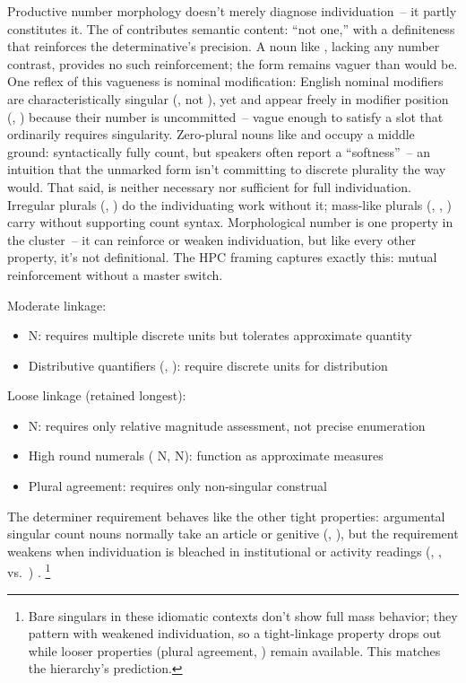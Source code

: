\documentclass[12pt,a4paper]{article}
\begin{document}
Productive number morphology doesn't merely diagnose individuation~-- it partly constitutes it. The  of  contributes semantic content: ``not one,'' with a definiteness that reinforces the determinative's precision. A noun like , lacking any number contrast, provides no such reinforcement; the form remains vaguer than  would be. One reflex of this vagueness is nominal modification: English nominal modifiers are characteristically singular (, not ), yet  and  appear freely in modifier position (, ) because their number is uncommitted~-- vague enough to satisfy a slot that ordinarily requires singularity. Zero-plural nouns like  and  occupy a middle ground: syntactically fully count, but speakers often report a \enquote{softness}~-- an intuition that the unmarked form isn't committing to discrete plurality the way  would. That said,  is neither necessary nor sufficient for full individuation. Irregular plurals (, ) do the individuating work without it; mass-like plurals (, , ) carry  without supporting count syntax. Morphological number is one property in the cluster~-- it can reinforce or weaken individuation, but like every other property, it's not definitional. The HPC framing captures exactly this: mutual reinforcement without a master switch.

Moderate linkage:
\begin{itemize}
\item {} N: requires multiple discrete units but tolerates approximate quantity
\item Distributive quantifiers (, ): require discrete units for distribution
\end{itemize}

Loose linkage (retained longest):
\begin{itemize}
\item {} N: requires only relative magnitude assessment, not precise enumeration
\item High round numerals ( N,  N): function as approximate measures
\item Plural agreement: requires only non-singular construal
\end{itemize}

The determiner requirement behaves like the other tight properties: argumental singular count nouns normally take an article or genitive (, ), but the requirement weakens when individuation is bleached in institutional or activity readings (, ,  vs.\ ) \citep[pp.~409--410]{huddleston2002}.%
\footnote{Bare singulars in these idiomatic contexts don't show full mass behavior; they pattern with weakened individuation, so a tight-linkage property drops out while looser properties (plural agreement, ) remain available. This matches the hierarchy's prediction.}
\end{document}
